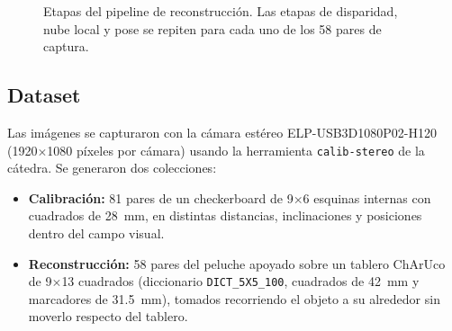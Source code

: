 \documentclass[conference]{IEEEtran}
\begin{document}
\begin{figure}[t]
  \centering
  \caption{Etapas del pipeline de reconstrucción. Las etapas de disparidad,
  nube local y pose se repiten para cada uno de los 58 pares de captura.}
  \label{fig:pipeline}
\end{figure}

\subsection{Dataset}

Las imágenes se capturaron con la cámara estéreo ELP-USB3D1080P02-H120
(1920$\times$1080 píxeles por cámara) usando la herramienta
\texttt{calib-stereo} de la cátedra. Se generaron dos colecciones:
\begin{itemize}
  \item \textbf{Calibración:} 81 pares de un checkerboard de 9$\times$6
        esquinas internas con cuadrados de 28~mm, en distintas distancias,
        inclinaciones y posiciones dentro del campo visual.
  \item \textbf{Reconstrucción:} 58 pares del peluche apoyado sobre un
        tablero ChArUco de 9$\times$13 cuadrados (diccionario
        \texttt{DICT\_5X5\_100}, cuadrados de 42~mm y marcadores de
        31.5~mm), tomados recorriendo el objeto a su alrededor sin moverlo
        respecto del tablero.
\end{itemize}
\end{document}
